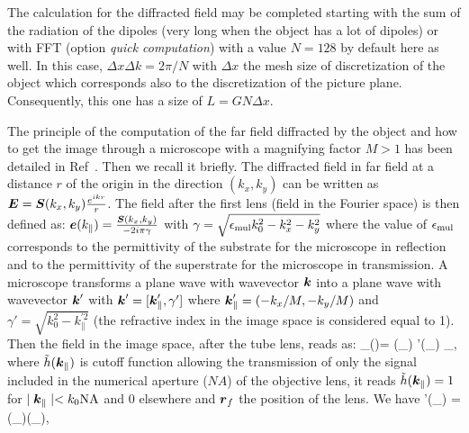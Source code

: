 The calculation for the diffracted field may be completed starting
with the sum of the radiation of the dipoles (very long when the
object has a lot of dipoles) or with FFT (option {\it quick
  computation}) with a value $N=128$ by default here as well. In this
case, $\Delta x \Delta k=2\pi/N$ with $\Delta x$ the mesh size of
discretization of the object which corresponds also to the
discretization of the picture plane. Consequently, this one has a size
of $L=G N \Delta x$.


The principle of the computation of the far field diffracted by the
object and how to get the image through a microscope with a magnifying
factor $M>1$ has been detailed in Ref~\cite{Khadir_JOSAA_19}. Then we
recall it briefly.  The diffracted field in far field at a distance
$r$ of the origin in the direction $(k_x,k_y)$ can be written as
$\boldsymbol{E}= \boldsymbol{S}(k_x,k_y) \frac{e^{i k r}}{r}$. The field after the
first lens (field in the Fourier space) is then defined as:
$\boldsymbol{e}(k_{\parallel})=\frac{\boldsymbol{S}(k_x,k_y)}{-2 i \pi \gamma}$ with
$\gamma=\sqrt{\epsilon_{\rm mul} k_0^2-k_x^2-k_y^2}$ where the value
of $\epsilon_{\rm mul}$ corresponds to the permittivity of the
substrate for the microscope in reflection and to the permittivity of
the superstrate for the microscope in transmission.  A microscope
transforms a plane wave with wavevector $\boldsymbol{k}$ into a plane wave
with wavevector $\boldsymbol{k}'$ with $\boldsymbol{k}'=[\boldsymbol{k}'_{\parallel},\gamma']$
where $\boldsymbol{k}'_{\parallel}=(-k_x/M,-k_y/M)$ and
$\gamma'=\sqrt{k_0^2-k_{\parallel}^{'2}}$ (the refractive index in the
image space is considered equal to 1). Then the field in the image
space, after the tube lens, reads as:
\be {}_()= \iint
{} (_{\parallel})
'(_{\parallel})  _{\parallel},
\label{objectfield}
\ee
where $\tilde{h}(\boldsymbol{k}_{\parallel})$ is cutoff function allowing the
transmission of only the signal included in the numerical aperture
($NA$) of the objective lens, it reads $\tilde{h}(\boldsymbol{k}_{\parallel})
= 1$ for $\mid \boldsymbol{k}_{\parallel} \mid < k_0 \mathrm{NA} $ and $0$
elsewhere and $\boldsymbol{r}_f$ the position of the lens. We have
\be {}'(_{\parallel}) =
(_{\parallel})(_{\parallel}),   \ee

